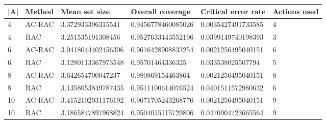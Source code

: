 \begin{tabular}{llllll}
\toprule
|A| & Method & Mean set size & Overall coverage & Critical error rate & Actions used \\
\midrule
4 & AC-RAC & 3.372933396315541 & 0.9456778460085026 & 0.0035427491733585 & 4 \\
4 & RAC & 3.251535191308456 & 0.9527633443552196 & 0.0399149740198393 & 3 \\
6 & AC-RAC & 3.0418044402456306 & 0.9676428908833254 & 0.0021256495040151 & 6 \\
6 & RAC & 3.1280113367973548 & 0.95701464336325 & 0.033538025507794 & 5 \\
8 & AC-RAC & 3.642654700047237 & 0.980869154463864 & 0.0021256495040151 & 8 \\
8 & RAC & 3.1358053849787435 & 0.9511100614076524 & 0.0401511572980632 & 6 \\
10 & AC-RAC & 3.4152102031176192 & 0.9671705243268776 & 0.0021256495040151 & 9 \\
10 & RAC & 3.1865847897968824 & 0.9504015115729806 & 0.0470004723665564 & 9 \\
\bottomrule
\end{tabular}
